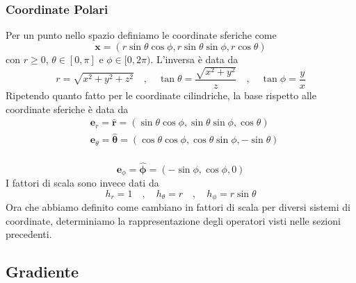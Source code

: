 \subsubsection{Coordinate Polari}
Per un punto nello spazio definiamo le coordinate sferiche come
\begin{equation*}
	\mathbf{x}=(r \sin \theta \cos \phi, r \sin \theta \sin \phi, r \cos \theta)
\end{equation*}
con $r \geq 0$, $\theta \in [0,\pi]$ e $\phi \in [0,2\pi)$. L'inversa \`e data da
\begin{equation*}
	r=\sqrt{x^2+y^2+z^2} \quad, \quad \tan \theta=\frac{\sqrt{x^2+y^2}}{z} \quad, \quad \tan \phi=\frac{y}{x}
\end{equation*}
Ripetendo quanto fatto per le coordinate cilindriche, la base rispetto alle coordinate sferiche \`e data da
\begin{equation*}
	\begin{aligned}
& \mathbf{e}_r=\hat{\mathbf{r}}=(\sin \theta \cos \phi, \sin \theta \sin \phi, \cos \theta) \\
& \mathbf{e}_\theta=\hat{\boldsymbol{\theta}}=(\cos \theta \cos \phi, \cos \theta \sin \phi,-\sin \theta)\\ 
\end{aligned}
\end{equation*}

\begin{equation*}
 \mathbf{e}_\phi=\hat{\boldsymbol{\phi}}=(-\sin \phi, \cos \phi, 0)	
\end{equation*}
I fattori di scala sono invece dati da
\begin{equation*}
	h_r=1 \quad, \quad h_\theta=r \quad, \quad h_\phi=r \sin \theta
\end{equation*}
Ora che abbiamo definito come cambiano in fattori di scala per diversi sistemi di coordinate, determiniamo la rappresentazione degli operatori visti nelle sezioni precedenti.

\subsection{Gradiente}

